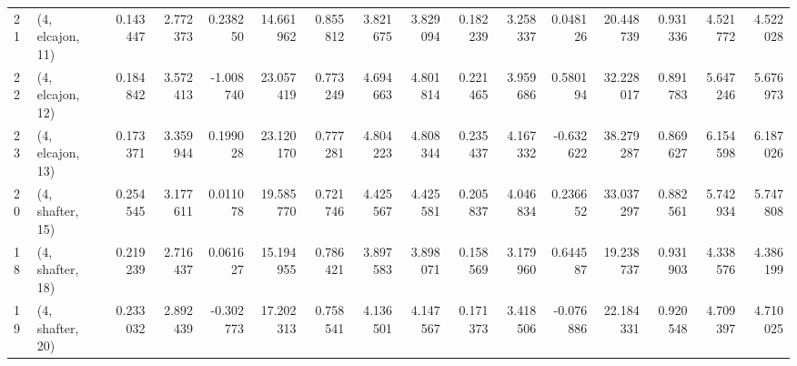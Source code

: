 \begin{tabular}{llrrrrrrrrrrrrrr}
21 &  (4, elcajon, 11) &   0.143447 &  2.772373 &  0.238250 &  14.661962 &  0.855812 &   3.821675 &  3.829094 &  0.182239 &  3.258337 &  0.048126 &   20.448739 &  0.931336 &   4.521772 &   4.522028 \\
22 &  (4, elcajon, 12) &   0.184842 &  3.572413 & -1.008740 &  23.057419 &  0.773249 &   4.694663 &  4.801814 &  0.221465 &  3.959686 &  0.580194 &   32.228017 &  0.891783 &   5.647246 &   5.676973 \\
23 &  (4, elcajon, 13) &   0.173371 &  3.359944 &  0.199028 &  23.120170 &  0.777281 &   4.804223 &  4.808344 &  0.235437 &  4.167332 & -0.632622 &   38.279287 &  0.869627 &   6.154598 &   6.187026 \\
20 &  (4, shafter, 15) &   0.254545 &  3.177611 &  0.011078 &  19.585770 &  0.721746 &   4.425567 &  4.425581 &  0.205837 &  4.046834 &  0.236652 &   33.037297 &  0.882561 &   5.742934 &   5.747808 \\
18 &  (4, shafter, 18) &   0.219239 &  2.716437 &  0.061627 &  15.194955 &  0.786421 &   3.897583 &  3.898071 &  0.158569 &  3.179960 &  0.644587 &   19.238737 &  0.931903 &   4.338576 &   4.386199 \\
19 &  (4, shafter, 20) &   0.233032 &  2.892439 & -0.302773 &  17.202313 &  0.758541 &   4.136501 &  4.147567 &  0.171373 &  3.418506 & -0.076886 &   22.184331 &  0.920548 &   4.709397 &   4.710025 \\
\bottomrule
\end{tabular}

